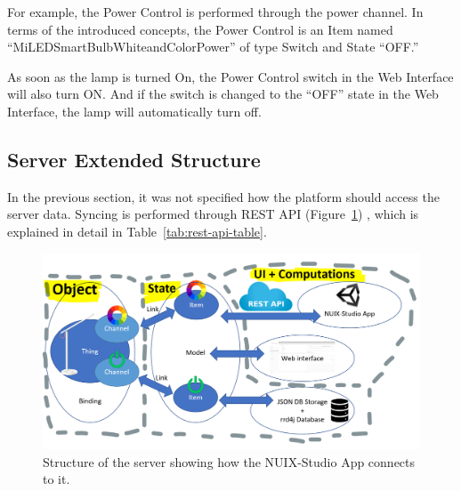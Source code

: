 For example, the Power Control is performed through the power channel. In terms of the introduced concepts, the Power Control is an Item named ``MiLEDSmartBulbWhiteandColorPower'' of type Switch and State ``OFF.''

As soon as the lamp is turned On, the Power Control switch in the Web Interface will also turn ON. And if the switch is changed to the ``OFF'' state in the Web Interface, the lamp will automatically turn off.

\subsection{Server Extended Structure}

In the previous section, it was not specified how the platform should access the server data. Syncing is performed through REST API (Figure~\ref{fig:ExtendedServerStructure-figure}) , which is explained in detail in Table~\ref{tab:rest-api-table}.

\begin{figure}
  \centering
  \includegraphics[width=0.9\linewidth]{figures/ExtendedServerStructure.png}
  \caption{Structure of the server showing how the NUIX-Studio App connects to it.}
  \label{fig:ExtendedServerStructure-figure}
\end{figure}

